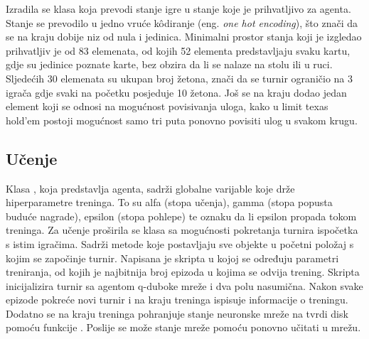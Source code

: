Izradila se klasa koja prevodi stanje igre u stanje koje je prihvatljivo za agenta. Stanje se prevodilo u jedno vruće k\^odiranje (eng. \textit{one hot encoding}), što znači da se na kraju dobije niz od nula i jedinica.  Minimalni prostor stanja koji je izgledao prihvatljiv je od 83 elemenata, od kojih 52 elementa predstavljaju svaku kartu, gdje su jedinice poznate karte, bez obzira da li se nalaze na stolu ili u ruci. Sljedećih 30 elemenata su ukupan broj žetona, znači da se turnir ograničio na 3 igrača gdje svaki na početku posjeduje 10 žetona. Još se na kraju dodao jedan element koji se odnosi na mogućnost povisivanja uloga, kako u limit texas hold'em postoji mogućnost samo tri puta ponovno povisiti ulog u svakom krugu.

\subsection{Učenje}
Klasa , koja predstavlja agenta, sadrži globalne varijable koje drže hiperparametre treninga. To su alfa (stopa učenja), gamma (stopa popusta buduće nagrade), epsilon (stopa pohlepe) te oznaku da li epsilon propada tokom treninga. Za učenje proširila se klasa  sa mogućnosti pokretanja turnira ispočetka s istim igračima. Sadrži metode koje postavljaju sve objekte u početni položaj s kojim se započinje turnir. Napisana je skripta u kojoj se određuju parametri treniranja, od kojih je najbitnija broj epizoda u kojima se odvija trening. Skripta inicijalizira turnir sa agentom q-duboke mreže i dva polu nasumična. Nakon svake epizode pokreće novi turnir i na kraju treninga ispisuje informacije o treningu. Dodatno se na kraju treninga pohranjuje stanje neuronske mreže na tvrdi disk pomoću funkcije . Poslije se može stanje mreže pomoću  ponovno učitati u mrežu. 

